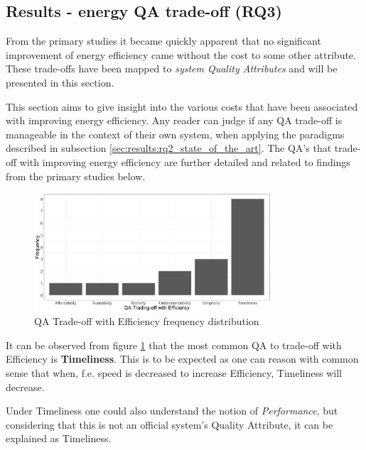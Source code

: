 
\subsection{Results - energy QA trade-off (RQ3)}
\label{sec:results:rq3_trade_off}
From the primary studies it became quickly apparent that no significant improvement of energy efficiency came without the cost
to some other attribute. These trade-offs have been mapped to 
\textit{system Quality Attributes\cite{iso2011quality_attributes}} and will be presented
in this section.

This section aims to give insight into the various costs that have been associated with improving energy efficiency.
Any reader can judge if any QA trade-off is manageable in the context of their own system, when applying the paradigms
described in subsection \ref{sec:results:rq2_state_of_the_art}. 
The QA's that trade-off with improving energy efficiency are further detailed and related to findings from the primary studies below.

\begin{figure}
    \includegraphics[width=250pt]{figures/trade_off_freq.png}
    \caption{QA Trade-off with Efficiency frequency distribution}
    \label{fig:trade_off_freq}
\end{figure}

\vspace{5mm}

It can be observed from figure \ref{fig:trade_off_freq} that the most common QA to trade-off with Efficiency is \textbf{Timeliness}.
This is to be expected as one can reason with common sense that when, f.e. speed is decreased to increase Efficiency, Timeliness will decrease.

Under Timeliness one could also understand the notion of \textit{Performance}, but considering that this is not an official
system's Quality Attribute, it can be explained as Timeliness.


